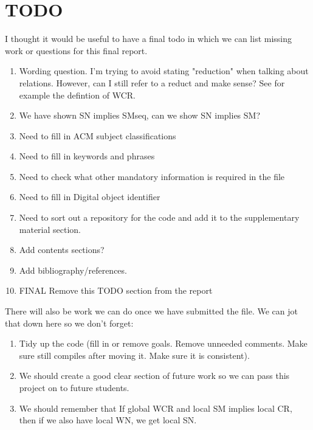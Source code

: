 \section{TODO}

I thought it would be useful to have a final todo in which we can list missing work or questions for this final report.

\begin{enumerate}
    \item Wording question. I'm trying to avoid stating "reduction" when talking about relations. However, can I still refer to a reduct and make sense? See for example the defintion of WCR.
    \item We have shown SN implies SMseq, can we show SN implies SM?
    \item Need to fill in ACM subject classifications
    \item Need to fill in keywords and phrases
    \item Need to check what other mandatory information is required in the file 
    \item Need to fill in Digital object identifier 
    \item Need to sort out a repository for the code and add it to the supplementary material section.  
    \item Add contents sections?
    \item Add bibliography/references.
    \item FINAL Remove this TODO section from the report 
\end{enumerate}

There will also be work we can do once we have submitted the file. We can jot that down here so we don't forget:

\begin{enumerate}
    \item Tidy up the code (fill in or remove goals. Remove unneeded comments. Make sure still compiles after moving it. Make sure it is consistent).
    \item We should create a good clear section of future work so we can pass this project on to future students.
    \item {We should remember that If global WCR and local SM implies local CR, then if we also have local WN, we get local SN.}
\end{enumerate}